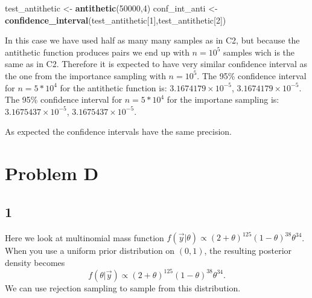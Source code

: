 \documentclass[
]{article}
\newenvironment{Shaded}{\begin{snugshade}}{\end{snugshade}}
\newcommand{\DecValTok}[1]{\textcolor[rgb]{0.00,0.00,0.81}{#1}}
\newcommand{\KeywordTok}[1]{\textcolor[rgb]{0.13,0.29,0.53}{\textbf{#1}}}
\newcommand{\NormalTok}[1]{#1}
\newcommand{\StringTok}[1]{\textcolor[rgb]{0.31,0.60,0.02}{#1}}
\begin{document}
\begin{Shaded}
\begin{Highlighting}[]
\NormalTok{test_antithetic <-}\StringTok{ }\KeywordTok{antithetic}\NormalTok{(}\DecValTok{50000}\NormalTok{,}\DecValTok{4}\NormalTok{)}
\NormalTok{conf_int_anti <-}\StringTok{ }\KeywordTok{confidence_interval}\NormalTok{(test_antithetic[}\DecValTok{1}\NormalTok{],test_antithetic[}\DecValTok{2}\NormalTok{])}
\end{Highlighting}
\end{Shaded}

In this case we have used half as many many samples as in C2, but
because the antithetic function produces pairs we end up with \(n=10^5\)
samples wich is the same as in C2. Therefore it is expected to have very
similar confidence interval as the one from the importance sampling with
\(n=10^5\). The 95\% confidence interval for \(n=5*10^4\) for the
antithetic function is: \ensuremath{3.1674179\times 10^{-5}},
\ensuremath{3.1674179\times 10^{-5}}. The 95\% confidence interval for
\(n=5*10^4\) for the importane sampling is:
\ensuremath{3.1675437\times 10^{-5}},
\ensuremath{3.1675437\times 10^{-5}}.

As expected the confidence intervals have the same precision.

\hypertarget{problem-d}{%
\section{Problem D}\label{problem-d}}

\hypertarget{section-4}{%
\subsection{1}\label{section-4}}

Here we look at multinomial mass function
\(f(\vec{y}|\theta)\propto(2+\theta)^{125}(1-\theta)^{38}\theta^{34}\).
When you use a uniform prior distribution on \((0,1)\), the resulting
posterior density becomes \[\begin{equation}
  f(\theta|\vec{y})\propto(2+\theta)^{125}(1-\theta)^{38}\theta^{34}.
\end{equation}\] We can use rejection sampling to sample from this
distribution.
\end{document}
